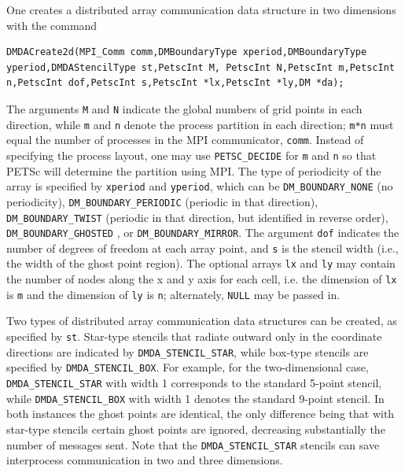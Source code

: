 One creates a distributed array communication data structure
in two dimensions with the command
\begin{lstlisting}
DMDACreate2d(MPI_Comm comm,DMBoundaryType xperiod,DMBoundaryType yperiod,DMDAStencilType st,PetscInt M, PetscInt N,PetscInt m,PetscInt n,PetscInt dof,PetscInt s,PetscInt *lx,PetscInt *ly,DM *da);
\end{lstlisting}
The   arguments
 \lstinline{M} and \lstinline{N} indicate the global
numbers of grid points in each direction, while \lstinline{m} and \lstinline{n}
denote the process partition in each direction; \lstinline{m*n} must equal
the number of processes in the MPI communicator, \lstinline{comm}.
Instead of specifying the process layout, one may use
\lstinline{PETSC_DECIDE} for \lstinline{m} and \lstinline{n}
so that PETSc will determine the partition using MPI. The type of
periodicity of the array is specified by \lstinline{xperiod} and \lstinline{yperiod}, which can be 
\lstinline{DM_BOUNDARY_NONE}  (no periodicity),
\lstinline{DM_BOUNDARY_PERIODIC}  (periodic in that direction),
\lstinline{DM_BOUNDARY_TWIST}  (periodic in that direction, but identified in reverse order),
\lstinline{DM_BOUNDARY_GHOSTED} ,
or \lstinline{DM_BOUNDARY_MIRROR}.  The argument \lstinline{dof}
indicates the number of degrees of freedom at each array point,
and \lstinline{s} is the stencil width (i.e., the width of the ghost point region).
The optional arrays \lstinline{lx} and \lstinline{ly} may contain the number of nodes
along the x and y axis for each cell, i.e. the dimension of \lstinline{lx} is
\lstinline{m} and the dimension of \lstinline{ly} is \lstinline{n}; alternately, \lstinline{NULL} may be passed in.

Two types of distributed array communication data structures
can be created, as specified by \lstinline{st}.
Star-type stencils that radiate outward only in the coordinate
directions are indicated by \lstinline{DMDA_STENCIL_STAR},
while box-type stencils are specified by
\lstinline{DMDA_STENCIL_BOX}. For example, for the
two-dimensional case,
\lstinline{DMDA_STENCIL_STAR} with width 1 corresponds to the standard 5-point
stencil, while \lstinline{DMDA_STENCIL_BOX} with width 1 denotes the
standard 9-point stencil.  In both instances the ghost points are
identical, the only difference being that with star-type stencils
certain ghost points are ignored, decreasing substantially
the number of messages sent.  Note that the \lstinline{DMDA_STENCIL_STAR}
stencils can save interprocess communication in two and three
dimensions.

